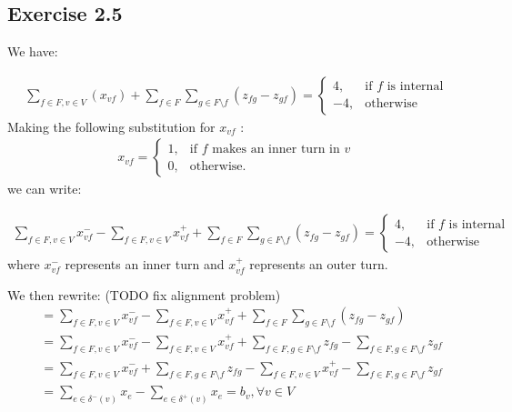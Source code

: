 \documentclass[12pt]{article}
\begin{document}
\subsection*{Exercise 2.5}

We have:

\begin{align*}
      \sum_{f \in F, v \in V}(x_{vf}) + \sum_{f \in F}\sum_{g \in F \setminus f}(z_{fg} - z_{gf}) = \begin{cases}
                                                                                       4, & \text{if } f \text{ is internal}\\
                                                                                      -4, & \text{otherwise}
                                                                                   \end{cases}
\end{align*}
Making the following substitution for $x_{vf}$ :
\begin{align*}
  x_{vf} =  \begin{cases}
               1, & \text{if } f \text{ makes an inner turn in } v \\
               0, & \text{otherwise.}
            \end{cases}
\end{align*}
we can write:

\begin{align*}
  \sum_{f \in F, v \in V}{x_{vf}^{-}} - \sum_{f \in F, v \in V}{x_{vf}^{+}} + \sum_{f \in F}\sum_{g \in F \setminus f}(z_{fg} - z_{gf}) = \begin{cases}
                                                                                       4, & \text{if } f \text{ is internal}\\
                                                                                      -4, & \text{otherwise}
                                                                                   \end{cases}
\end{align*}
where $x_{vf}^{-}$ represents an inner turn and $x_{vf}^{+}$ represents an outer turn.

We then rewrite: (TODO fix alignment problem)
\begin{align*}
  &= \sum_{f \in F, v \in V}{x_{vf}^{-}} - \sum_{f \in F, v \in V}{x_{vf}^{+}} + \sum_{f \in F}\sum_{g \in F \setminus f}(z_{fg} - z_{gf})\\
  &= \sum_{f \in F, v \in V}{x_{vf}^{-}} - \sum_{f \in F, v \in V}{x_{vf}^{+}} + \sum_{f \in F, g \in F\setminus f}{z_{fg}} - \sum_{f \in F, g \in F \setminus f}z_{gf}\\
  &= \sum_{f \in F, v \in V}{x_{vf}^{-}} + \sum_{f \in F, g \in F\setminus f}{z_{fg}} - \sum_{f \in F, v \in V}{x_{vf}^{+}} - \sum_{f \in F, g \in F \setminus f}z_{gf}\\
  &= \sum_{e \in \delta^{-}(v)}{x_e} - \sum_{e \in \delta^{+}(v)}{x_e} = b_v, \forall v \in V
\end{align*}
\end{document}
